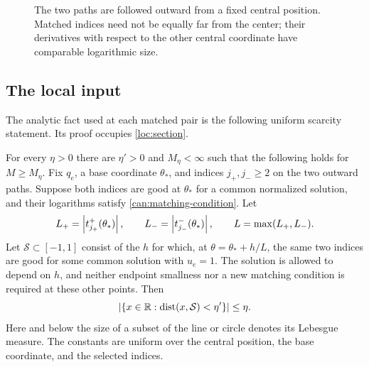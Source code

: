 \begin{figure}[tb]
\centering
{}
\caption{The two paths are followed outward from a fixed central position.
Matched indices need not be equally far from the center; their derivatives
with respect to the other central coordinate have comparable logarithmic
size.}
\label{can:wing-figure}
\end{figure}

\subsection{The local input}

The analytic fact used at each matched pair is the following uniform
scarcity statement.  Its proof occupies \cref{loc:section}.

\begin{lemma}\label{can:local-scarcity}
For every $\eta>0$ there are $\eta'>0$ and $M_\eta<\infty$ such that
the following holds for $M\ge M_\eta$.  Fix $q_e$, a base coordinate
$\theta_*$, and indices $j_+,j_-\ge2$ on the two outward paths.
Suppose both indices are good at $\theta_*$ for a common normalized
solution, and their logarithms satisfy
\cref{can:matching-condition}.  Let
\[
L_+=\left\lvert t_{j_+}^+(\theta_*)\right\rvert,\qquad
L_-=\left\lvert t_{j_-}^-(\theta_*)\right\rvert,\qquad L=\max(L_+,L_-).
\]
Let $\mathcal S\subset[-1,1]$ consist of the $h$ for which, at
$\theta=\theta_*+h/L$, the same two indices are good for some common
solution with $u_e=1$.  The solution is allowed to depend on $h$, and
neither endpoint smallness nor a new matching condition is required at
these other points.  Then
\begin{equation}\label{can:scarcity-bound}
\left\lvert\{x\in\mathbb{R}:\operatorname{dist}(x,\mathcal S)<\eta'\}\right\rvert\le\eta.
\end{equation}
Here and below the size of a subset of the line or circle denotes its
Lebesgue measure.  The constants are uniform over the central position,
the base coordinate, and the selected indices.
\end{lemma}

